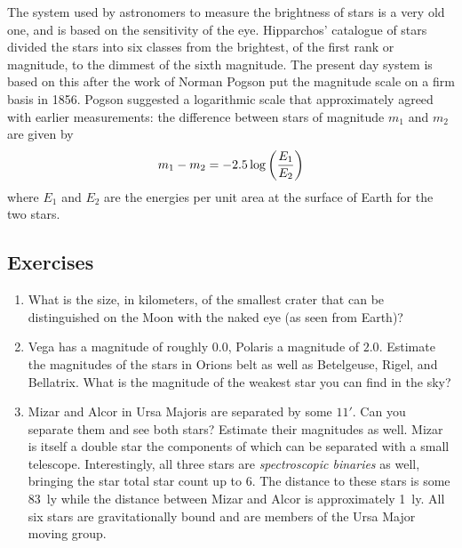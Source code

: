 The system used by astronomers to measure the brightness of stars is a
very old one, and is based on the sensitivity of the eye. Hipparchos'
catalogue of stars divided the stars into six classes from the
brightest, of the first rank or magnitude, to the dimmest of the sixth
magnitude. The present day system is based on this after the work of
Norman Pogson put the magnitude scale on a firm basis in 1856. Pogson
suggested a logarithmic scale that approximately agreed with earlier
measurements: the difference between stars of magnitude $m_1$ and
$m_2$ are given by 
\[
m_1-m_2=-2.5\log\left({E_1\over E_2}\right)
\]
where $E_1$ and $E_2$ are the energies per unit area at the surface of
Earth for the two stars.

\subsection*{Exercises}

\begin{enumerate}
\item What is the size, in kilometers, of the smallest crater that can be distinguished on 
the Moon with the naked eye (as seen from Earth)?
\item Vega has a magnitude of roughly $0.0$, Polaris a magnitude of $2.0$. 
Estimate the magnitudes of the stars in Orions belt as well as Betelgeuse,
Rigel, and Bellatrix. What is the magnitude of the weakest star you can find
in the sky? 
\item Mizar and Alcor in Ursa Majoris are separated by some $11'$.
 Can you separate them and see both stars? Estimate their magnitudes
 as well. Mizar is itself a double star the components of which can be
 separated with a small telescope. Interestingly, all three stars are
 {\it spectroscopic binaries} as well, bringing the star total star
 count up to 6. The distance to these stars is some 83~ly while the
 distance between Mizar and Alcor is approximately
 1~ly. All six stars are  gravitationally bound and are
 members of the Ursa Major moving group.
\end{enumerate}


